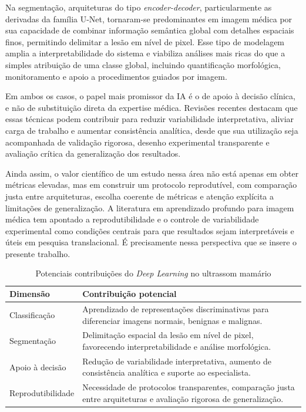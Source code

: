 \documentclass[tcc,capa]{texufpel}
\begin{document}
Na segmentação, arquiteturas do tipo \textit{encoder-decoder}, particularmente as derivadas da família U-Net, tornaram-se predominantes em imagem médica por sua capacidade de combinar informação semântica global com detalhes espaciais finos, permitindo delimitar a lesão em nível de pixel. Esse tipo de modelagem amplia a interpretabilidade do sistema e viabiliza análises mais ricas do que a simples atribuição de uma classe global, incluindo quantificação morfológica, monitoramento e apoio a procedimentos guiados por imagem. \cite{Yap2018,Zhang2022BUSIS,Rahmani2024}

Em ambos os casos, o papel mais promissor da IA é o de apoio à decisão clínica, e não de substituição direta da expertise médica. Revisões recentes destacam que essas técnicas podem contribuir para reduzir variabilidade interpretativa, aliviar carga de trabalho e aumentar consistência analítica, desde que sua utilização seja acompanhada de validação rigorosa, desenho experimental transparente e avaliação crítica da generalização dos resultados. \cite{Liu2025AIBUS,Dan2024,Iacob2024}

Ainda assim, o valor científico de um estudo nessa área não está apenas em obter métricas elevadas, mas em construir um protocolo reprodutível, com comparação justa entre arquiteturas, escolha coerente de métricas e atenção explícita a limitações de generalização. A literatura em aprendizado profundo para imagem médica tem apontado a reprodutibilidade e o controle de variabilidade experimental como condições centrais para que resultados sejam interpretáveis e úteis em pesquisa translacional. \cite{Moassefi2023,Simko2024,Renard2020} É precisamente nessa perspectiva que se insere o presente trabalho.

\begin{table}[htbp]
	\centering
	\caption{Potenciais contribuições do \textit{Deep Learning} no ultrassom mamário}
	\label{tab:potencial_dl_ultrassom_mamario}
	\begin{tabular}{|p{4.0cm}|p{9.0cm}|}
		\hline
		\textbf{Dimensão} & \textbf{Contribuição potencial} \\ \hline
		Classificação & Aprendizado de representações discriminativas para diferenciar imagens normais, benignas e malignas. \\ \hline
		Segmentação & Delimitação espacial da lesão em nível de pixel, favorecendo interpretabilidade e análise morfológica. \\ \hline
		Apoio à decisão & Redução de variabilidade interpretativa, aumento de consistência analítica e suporte ao especialista. \\ \hline
		Reprodutibilidade & Necessidade de protocolos transparentes, comparação justa entre arquiteturas e avaliação rigorosa de generalização. \\ \hline
	\end{tabular}
\end{table}
\end{document}
